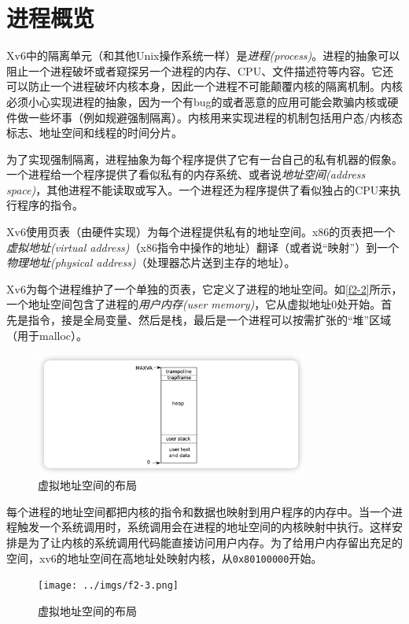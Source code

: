 \section{进程概览}
Xv6中的隔离单元（和其他Unix操作系统一样）是\emph{进程(process)}。进程的抽象可以阻止一个进程破坏或者窥探另一个进程的内存、CPU、文件描述符等内容。它还可以防止一个进程破坏内核本身，因此一个进程不可能颠覆内核的隔离机制。内核必须小心实现进程的抽象，因为一个有bug的或者恶意的应用可能会欺骗内核或硬件做一些坏事（例如规避强制隔离）。内核用来实现进程的机制包括用户态/内核态标志、地址空间和线程的时间分片。

为了实现强制隔离，进程抽象为每个程序提供了它有一台自己的私有机器的假象。一个进程给一个程序提供了看似私有的内存系统、或者说\emph{地址空间(address space)}，其他进程不能读取或写入。一个进程还为程序提供了看似独占的CPU来执行程序的指令。

Xv6使用页表（由硬件实现）为每个进程提供私有的地址空间。x86的页表把一个\emph{虚拟地址(virtual address)}（x86指令中操作的地址）翻译（或者说“映射”）到一个\emph{物理地址(physical address)}（处理器芯片送到主存的地址）。

Xv6为每个进程维护了一个单独的页表，它定义了进程的地址空间。如\autoref{f2-2}所示，一个地址空间包含了进程的\emph{用户内存(user memory)}，它从虚拟地址0处开始。首先是指令，接是全局变量、然后是栈，最后是一个进程可以按需扩张的“堆”区域（用于malloc）。

\begin{figure}[htbp]
    \centering
    \includegraphics[width=0.8\textwidth]{../imgs/f2-2.png}
    \caption{虚拟地址空间的布局}
    \label{f2-2}
\end{figure}

每个进程的地址空间都把内核的指令和数据也映射到用户程序的内存中。当一个进程触发一个系统调用时，系统调用会在进程的地址空间的内核映射中执行。这样安排是为了让内核的系统调用代码能直接访问用户内存。为了给用户内存留出充足的空间，xv6的地址空间在高地址处映射内核，从\texttt{0x80100000}开始。

\begin{figure}[htbp]
    \centering
    \texttt{[image: ../imgs/f2-3.png]}
    \caption{虚拟地址空间的布局}
    \label{f2-3}
\end{figure}

